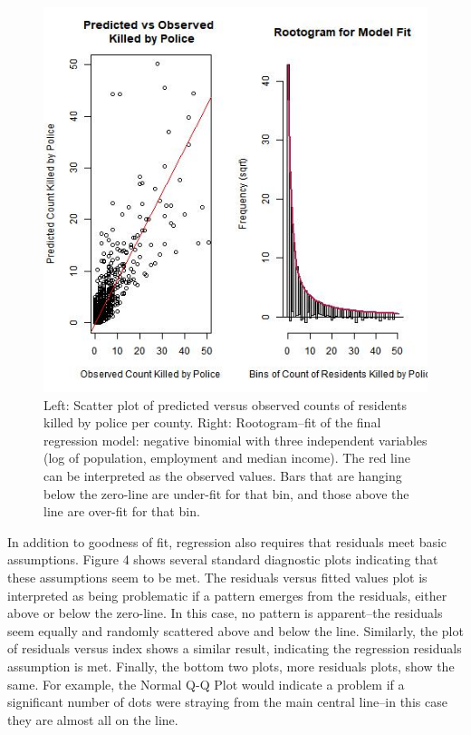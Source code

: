 \documentclass[sigconf]{acmart}
\begin{document}
\begin{figure}
\includegraphics[width=1.0\textwidth]{images/figure3.jpg}
\caption{Left: Scatter plot of predicted versus observed counts of residents killed by police per county. Right: Rootogram--fit of the final regression model: negative binomial with three independent variables (log of population, employment and median income).  The red line can be interpreted as the observed values.  Bars that are hanging below the zero-line are under-fit for that bin, and those above the line are over-fit for that bin.}
\end{figure}

In addition to goodness of fit, regression also requires that residuals meet basic assumptions.  Figure 4 shows several standard diagnostic plots indicating that these assumptions seem to be met.  The residuals versus fitted values plot is interpreted as being problematic if a pattern emerges from the residuals, either above or below the zero-line.  In this case, no pattern is apparent--the residuals seem equally and randomly scattered above and below the line.  Similarly, the plot of residuals versus index shows a similar result, indicating the regression residuals assumption is met.  Finally, the bottom two plots, more residuals plots, show the same.  For example, the Normal Q-Q Plot would indicate a problem if a significant number of dots were straying from the main central line--in this case they are almost all on the line. \cite{hocking}
\end{document}
